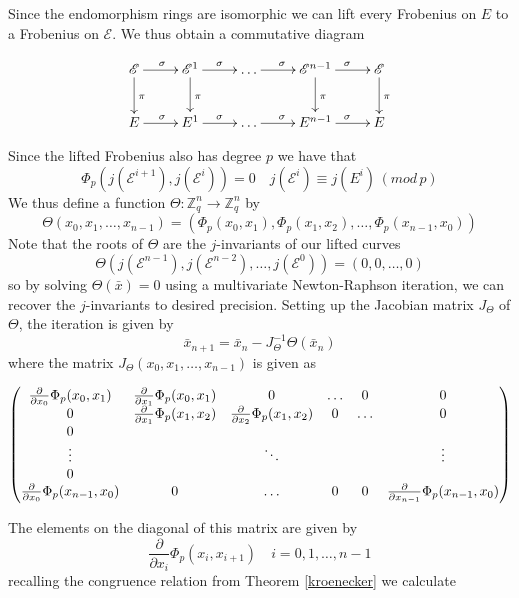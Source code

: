 Since the endomorphism rings are isomorphic we can lift every Frobenius on $E$ to a
Frobenius on $\mathscr{E}$. We thus obtain a commutative diagram

$$
\xymatrix {
  \mathscr{E} \ar[d]^\pi \ar[r]^\sigma & \mathscr{E}^1 \ar[d]^\pi \ar[r]^\sigma & \ldots \ar[r]^\sigma & \mathscr{E}^{n-1} \ar[d]^\pi \ar[r]^\sigma & \mathscr{E} \ar[d]^\pi \\
  E \ar[r]^\sigma & E^1 \ar[r]^\sigma &\ldots \ar[r]^\sigma & E^{n-1} \ar[r]^\sigma & E \\
}
$$

Since the lifted Frobenius also has degree $p$ we have that
$$\Phi_p(j(\mathscr{E}^{i+1}), j(\mathscr{E}^{i})) = 0 \quad j(\mathscr{E}^i) \equiv j(E^i) \, (mod\, p) $$
We thus define a function $\Theta: \mathbb{Z}_q^n \rightarrow \mathbb{Z}_q^n$ by
$$\Theta(x_0, x_1, \ldots, x_{n-1}) = (\Phi_p(x_0, x_1), \Phi_p(x_1, x_2), \ldots, \Phi_p(x_{n-1}, x_0))$$
Note that the roots of $\Theta$ are the $j$-invariants of our lifted curves
$$\Theta(j(\mathscr{E}^{n-1}), j(\mathscr{E}^{n-2}), \ldots, j(\mathscr{E}^0)) = (0, 0, \ldots, 0) $$
so by solving $\Theta(\bar{x}) = 0$ using a multivariate Newton-Raphson iteration, we can
recover the $j$-invariants to desired precision. Setting up the Jacobian matrix $J_\Theta$
of $\Theta$, the iteration is given by
$$ \bar{x}_{n+1} = \bar{x}_n - J_\Theta^{-1} \Theta(\bar{x}_n) $$
where the matrix $J_\Theta(x_0, x_1, \ldots, x_{n-1})$ is given as 

$$
\begin{pmatrix}
  {\partial \over \partial x_0} \Phi_p(x_0, x_1) & {\partial \over \partial x_1} \Phi_p(x_0, x_1) & 0 & \ldots & 0 & 0 \\
  0 & {\partial \over \partial x_1} \Phi_p(x_1, x_2) & {\partial \over \partial x_2} \Phi_p(x_1, x_2) & 0 & \ldots & 0 \\
  0 \\
  \vdots & & \ddots & & & \vdots \\
  0 \\
  {\partial \over \partial x_0} \Phi_p(x_{n-1}, x_0) & 0 & \ldots & 0 & 0 & {\partial \over \partial x_{n-1}} \Phi_p(x_{n-1}, x_0) \\
\end{pmatrix}
$$

The elements on the diagonal of this matrix are given by
$$ \frac{\partial}{\partial x_i} \Phi_p(x_i, x_{i+1}) \quad i =  0, 1, \ldots, n-1$$
recalling the congruence relation from Theorem \ref{kroenecker} we calculate

